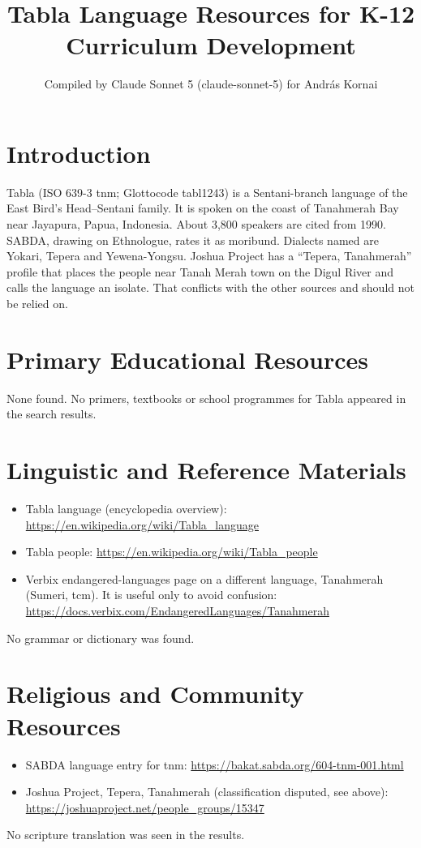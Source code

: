 \documentclass[12pt]{article}
\title{Tabla Language Resources for K-12 Curriculum Development}
\author{Compiled by Claude Sonnet 5 (claude-sonnet-5) for Andr\'as Kornai}
\date{}
\begin{document}
\maketitle

\section{Introduction}
Tabla (ISO 639-3 tnm; Glottocode tabl1243) is a Sentani-branch language of the East Bird's Head--Sentani family. It is spoken on the coast of Tanahmerah Bay near Jayapura, Papua, Indonesia. About 3,800 speakers are cited from 1990. SABDA, drawing on Ethnologue, rates it as moribund. Dialects named are Yokari, Tepera and Yewena-Yongsu. Joshua Project has a ``Tepera, Tanahmerah'' profile that places the people near Tanah Merah town on the Digul River and calls the language an isolate. That conflicts with the other sources and should not be relied on.

\section{Primary Educational Resources}
None found. No primers, textbooks or school programmes for Tabla appeared in the search results.

\section{Linguistic and Reference Materials}
\begin{itemize}
\item Tabla language (encyclopedia overview): \url{https://en.wikipedia.org/wiki/Tabla_language}
\item Tabla people: \url{https://en.wikipedia.org/wiki/Tabla_people}
\item Verbix endangered-languages page on a different language, Tanahmerah (Sumeri, tcm). It is useful only to avoid confusion: \url{https://docs.verbix.com/EndangeredLanguages/Tanahmerah}
\end{itemize}
No grammar or dictionary was found.

\section{Religious and Community Resources}
\begin{itemize}
\item SABDA language entry for tnm: \url{https://bakat.sabda.org/604-tnm-001.html}
\item Joshua Project, Tepera, Tanahmerah (classification disputed, see above): \url{https://joshuaproject.net/people_groups/15347}
\end{itemize}
No scripture translation was seen in the results.
\end{document}

